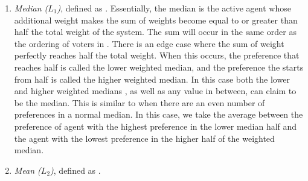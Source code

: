 \begin{enumerate}
    \item {
        \textit{Median ($L_1$)}, defined as
        $$.
        Essentially, the median is the active agent whose additional weight makes the
        sum of weights become equal to or greater than half the total weight of the
        system.
        The sum will occur in the same order as the ordering of voters in
        \systemproxies.
        There is an edge case where the sum of weight perfectly reaches half the
        total weight.
        When this occurs, the preference that reaches half is called the lower
        weighted median, and the preference the starts from half is called the higher
        weighted median.
        In this case both the lower and higher weighted medians
        , as well as any value in between, can claim to be the median.
        This is similar to when there are an even number of preferences in a normal
        median.
        In this case, we take the average between the preference of agent with
        the highest preference in the lower median half and the agent with the lowest
        preference in the higher half of the weighted median.
    }
    \item {
        \textit{Mean ($L_2$)}, defined as
        $$.
}
\end{enumerate}
